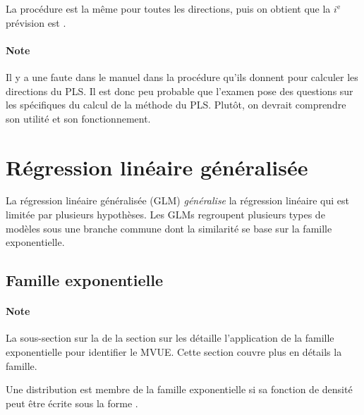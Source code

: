 \documentclass[french]{article}
\begin{document}
\begin{multicols*}{2}
\begin{definitionNOHFILLsub}[Coefficients]
\bigskip

La procédure est la même pour toutes les directions, puis on obtient que la $i^{\text{e}}$ prévision est .
\end{definitionNOHFILLsub}

\paragraph{Note}	Il y a une faute dans le manuel dans la procédure qu'ils donnent pour calculer les directions du PLS. Il est donc peu probable que l'examen pose des questions sur les spécifiques du calcul de la méthode du PLS. Plutôt, on devrait comprendre son utilité et son fonctionnement.



\newpage
\section{Régression linéaire généralisée}\label{sec:GLM}
\begin{rappel_enhanced}[Contexte]
La régression linéaire généralisée (GLM) \textit{généralise} la régression linéaire qui est limitée par plusieurs hypothèses. Les GLMs regroupent plusieurs types de modèles sous une branche commune dont la similarité se base sur la famille exponentielle.
\end{rappel_enhanced}

\subsection{Famille exponentielle}\label{subsec:ExpFamRegr}
\paragraph{Note}	La sous-section sur la \underline{\textit{}} de la section sur les \textit{\underline{}} détaille l'application de la famille exponentielle pour identifier le MVUE. Cette section couvre plus en détails la famille.

\bigskip

\begin{definitionNOHFILL}
Une distribution est membre de la famille exponentielle si sa fonction de densité peut être écrite sous la forme . 


\end{definitionNOHFILL}
\end{multicols*}
\end{document}
